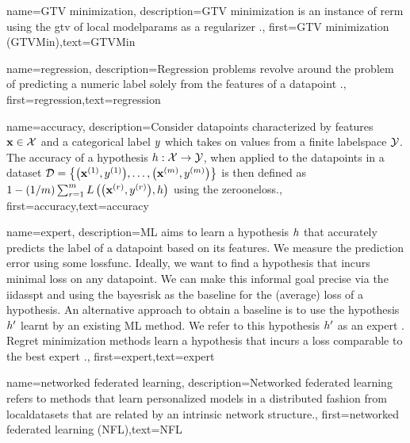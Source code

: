 {name={GTV minimization},
	description={GTV minimization is an instance of \gls{rerm} 
		using the \gls{gtv} of local \gls{modelparams} as a \gls{regularizer} \cite{ClusteredFLTVMinTSP}.},
	first={GTV minimization (GTVMin)},text={GTVMin} 
}

{name={regression},
	description={Regression problems revolve around the problem of 
		predicting a numeric \gls{label} solely from the \gls{feature}s of a \gls{datapoint} \cite[Ch. 2]{MLBasics}.},
	first={regression},text={regression} 
}

{name={accuracy},
	description={Consider \gls{datapoint}s characterized by \gls{feature}s ${\bf x} \in \mathcal{X}$ and 
		a categorical label $y$ which takes on values from a finite \gls{labelspace} $\mathcal{Y}$. The 
		accuracy of a \gls{hypothesis} $h: \mathcal{X} \rightarrow \mathcal{Y}$, when applied 
		to the \gls{datapoint}s in a \gls{dataset} $\mathcal{D} = \big\{ \big({\bf x}^{(1)}, y^{(1)} \big), \ldots, \big({\bf x}^{(m)},y^{(m)}\big) \big\}$ 
		is then defined as $1 - (1/m)\sum_{r=1}^{m} L\left(\big({\bf x}^{(r)},y^{(r)}\big),h \right)$ using the \gls{zerooneloss}.},
	first={accuracy},text={accuracy} 
}



{name={expert},
	description={ML aims to learn a \gls{hypothesis} $h$ that accurately predicts the \gls{label} 
		of a \gls{datapoint} based on its \gls{feature}s. We measure the prediction error using 
		some \gls{lossfunc}. Ideally, we want to find a \gls{hypothesis} that incurs minimal \gls{loss} 
		on any \gls{datapoint}. We can make this informal goal precise via the \gls{iidasspt} 
		and using the \gls{bayesrisk} as the \gls{baseline} for the (average) \gls{loss} of a \gls{hypothesis}. 
		An alternative approach to obtain a \gls{baseline} is to use the \gls{hypothesis} $h'$ learnt 
		by an existing ML method. We refer to this \gls{hypothesis} $h'$ as an expert \cite{PredictionLearningGames}. Regret minimization methods learn a \gls{hypothesis}
		that incurs a \gls{loss} comparable to the best expert \cite{PredictionLearningGames,HazanOCO}.},
	first={expert},text={expert} 
}

{name={networked federated learning},
	description={Networked federated learning refers 
		to methods that learn personalized models in a distributed fashion from \gls{localdataset}s 
		that are related by an intrinsic network structure.},
 first={networked federated learning (NFL)},text={NFL} 
}




